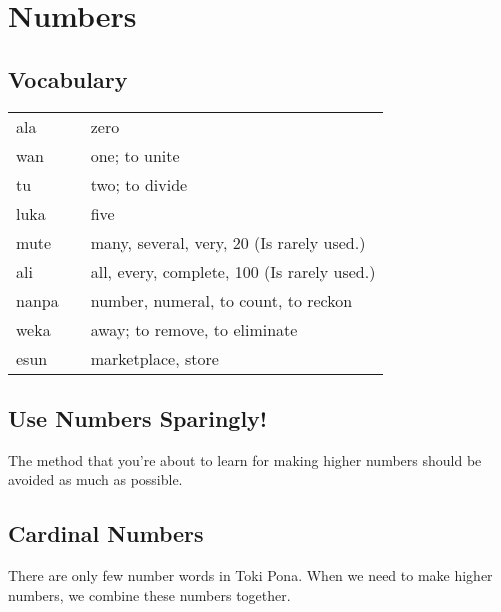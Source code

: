 \section{Numbers}
%
\subsection*{Vocabulary}
%
\begin{supertabular}{p{5,5cm}|ll}
ala && zero \\
wan && one; to unite \\
tu && two; to divide \\
luka && five \\
mute && many, several, very, 20 (Is rarely used.) \\
ali && all, every, complete, 100 (Is rarely used.)\\
nanpa && number, numeral, to count, to reckon     \\
weka && away; to remove, to eliminate \\
esun && marketplace, store \\
\end{supertabular} 
%
\subsection*{Use Numbers Sparingly!}
%
The method that you're about to learn for making higher numbers should be avoided as much as possible. 
%
\subsection*{Cardinal Numbers}
%
There are only few number words in Toki Pona.
When we need to make higher numbers, we combine these numbers together. 

